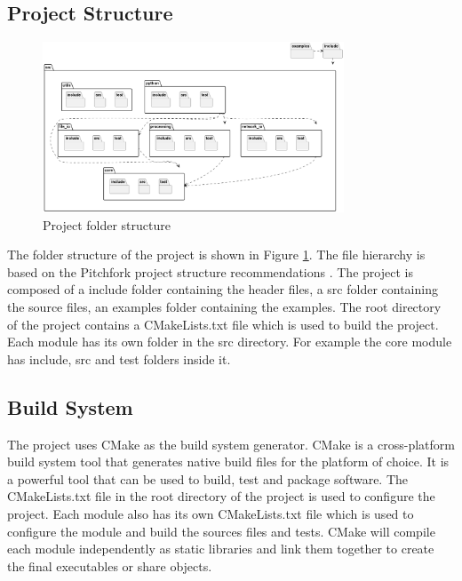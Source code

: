 \begin{spacing}{1.2}
    \subsection{Project Structure}
    \begin{figure}[hb]
        \centering
        \includegraphics[width=0.8\textwidth]{Chapitre2/figures/folders.png}
        \caption{Project folder structure}
        \label{fig:folders}
    \end{figure}
    The folder structure of the project is shown in Figure \ref{fig:folders}. The file hierarchy
    is based on the Pitchfork project structure recommendations \cite{pitchfork}.
    The project is composed of a include folder containing the header files,
    a src folder containing the source files,
    an examples folder containing the examples.
    The root directory of the project contains a CMakeLists.txt file which is used to build the project.
    Each module has its own folder in the src directory.
    For example the core module has include, src and test folders inside it.




    \subsection{Build System}
    The project uses CMake as the build system generator. CMake is a cross-platform build system tool that
    generates native build files for the platform of choice. It is a powerful tool that
    can be used to build, test and package software. The CMakeLists.txt file in the root directory
    of the project is used to configure the project. Each module also has its own CMakeLists.txt
    file which is used to configure the module and build the sources files and tests. CMake will compile
    each module independently as static libraries and link them together to create the final
    executables or share objects.\\


\end{spacing}
